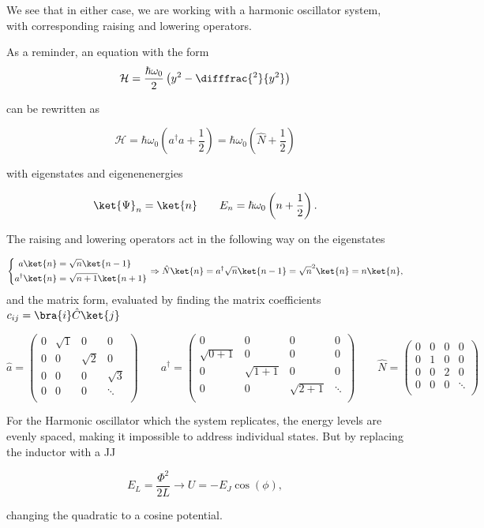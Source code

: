    We see that in either case, we are working with a harmonic oscillator system, with corresponding raising and lowering operators. 
   
   {\scriptsize As a reminder, an equation with the form
		\[
			\mathcal{H} = \frac{\hbar\omega_0}{2}\left(y^2-\difffrac{^2}{y^2}\right)
		\]
		
		\noindent can be rewritten as
		
		\[
			\mathcal{H} = \hbar\omega_0\left(a^{\dagger}a+\frac{1}{2}\right)= \hbar\omega_0\left(\hat{N}+\frac{1}{2}\right)
		\]
		
		with eigenstates and eigenenenergies
		
		\[
			\ket{\Psi}_n=\ket{n} \qquad E_n= \hbar\omega_0\left(n+\frac{1}{2}\right).
		\]
		
		\noindent The raising and lowering operators act in the following way on the eigenstates
		
		\[
			\left\lbrace\begin{aligned}
			a\ket{n} & = \sqrt{n}\ket{n-1}\\
			a^{\dagger}\ket{n} &= \sqrt{n+1}\ket{n+1}\\ 
			\end{aligned}\right. \Rightarrow 
			\hat{N}\ket{n} = 	a^{\dagger} \sqrt{n}\ket{n-1} = \sqrt{n}^2\ket{n}=n\ket{n}	,
		\]
		\noindent and the matrix form, evaluated by finding the matrix coefficients $ c_{ij}=\bra{i}\hat{C}\ket{j} $ 
		
		\[
			\hat{a}=\begin{pmatrix}
				0 & \sqrt{1} & 0 & 0\\
				0 & 0 & \sqrt{2} & 0\\
				0 & 0 & 0 & \sqrt{3}\\
				0 & 0 & 0 & \ddots\\
			\end{pmatrix} \qquad
			a^{\dagger}=\begin{pmatrix}
			0 & 0 & 0 & 0\\
			\sqrt{0+1} & 0 & 0 & 0\\
			0 & \sqrt{1+1} & 0 & 0\\
			0 & 0 & \sqrt{2+1} & \ddots\\
			\end{pmatrix} \qquad
			\hat{N} =\begin{pmatrix}
			0 & 0 & 0 & 0\\
			0 & 1 & 0 & 0\\
			0 & 0 & 2 & 0\\
			0 & 0 & 0 & \ddots\\
			\end{pmatrix} 
		\]
   }
   
   For the Harmonic oscillator which the system replicates, the energy levels are evenly spaced, making it impossible to address individual states. But by replacing the inductor with a JJ
   
   \begin{equation}
   	E_L = \frac{\Phi^2}{2L} \longrightarrow U = -E_J\cos(\phi),
   \end{equation}
   
   \noindent changing the quadratic to a cosine potential.
  \newpage
